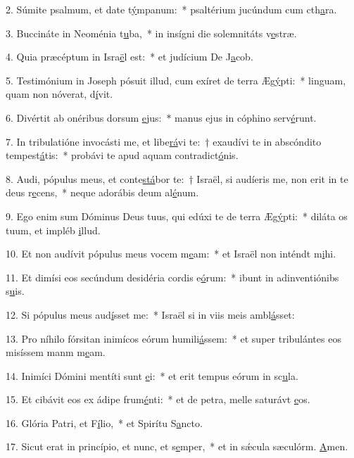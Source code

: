 2. Súmite psalmum, et date t\uline{ý}mpanum:~* psaltérium jucúndum cum cth\uline{a}ra.\par 
3. Buccináte in Neoménia t\uline{u}ba,~* in insígni die solemnitáts v\uline{e}stræ.\par 
4. Quia præcéptum in Isra\uline{ë}l est:~* et judícium De J\uline{a}cob.\par 
5. Testimónium in Joseph pósuit illud, cum exíret de terra Æg\uline{ý}pti:~* linguam, quam non nóverat, d\uline{í}vit.\par 
6. Divértit ab onéribus dorsum \uline{e}jus:~* manus ejus in cóphino serv\uline{é}runt.\par 
7. In tribulatióne invocásti me, et libe\uline{rá}vi te:~† exaudívi te in abscóndito tempest\uline{á}tis:~* probávi te apud aquam contradict\uline{ó}nis.\par 
8. Audi, pópulus meus, et conte\uline{stá}bor te:~† Israël, si audíeris me, non erit in te deus r\uline{e}cens,~* neque adorábis deum al\uline{é}num.\par 
9. Ego enim sum Dóminus Deus tuus, qui edúxi te de terra Æg\uline{ý}pti:~* diláta os tuum, et impléb \uline{i}llud.\par 
10. Et non audívit pópulus meus vocem m\uline{e}am:~* et Israël non inténdt m\uline{i}hi.\par 
11. Et dimísi eos secúndum desidéria cordis e\uline{ó}rum:~* ibunt in adinventiónibs s\uline{u}is.\par 
12. Si pópulus meus aud\uline{í}sset me:~* Israël si in viis meis ambl\uline{á}sset:\par 
13. Pro níhilo fórsitan inimícos eórum humili\uline{á}ssem:~* et super tribulántes eos misíssem manm m\uline{e}am.\par 
14. Inimíci Dómini mentíti sunt \uline{e}i:~* et erit tempus eórum in sc\uline{u}la.\par 
15. Et cibávit eos ex ádipe frum\uline{é}nti:~* et de petra, melle saturávt \uline{e}os.\par 
16. Glória Patri, et F\uline{í}lio,~* et Spirítu S\uline{a}ncto.\par 
17. Sicut erat in princípio, et nunc, et s\uline{e}mper,~* et in sǽcula sæculórm. \uline{A}men.\par 
